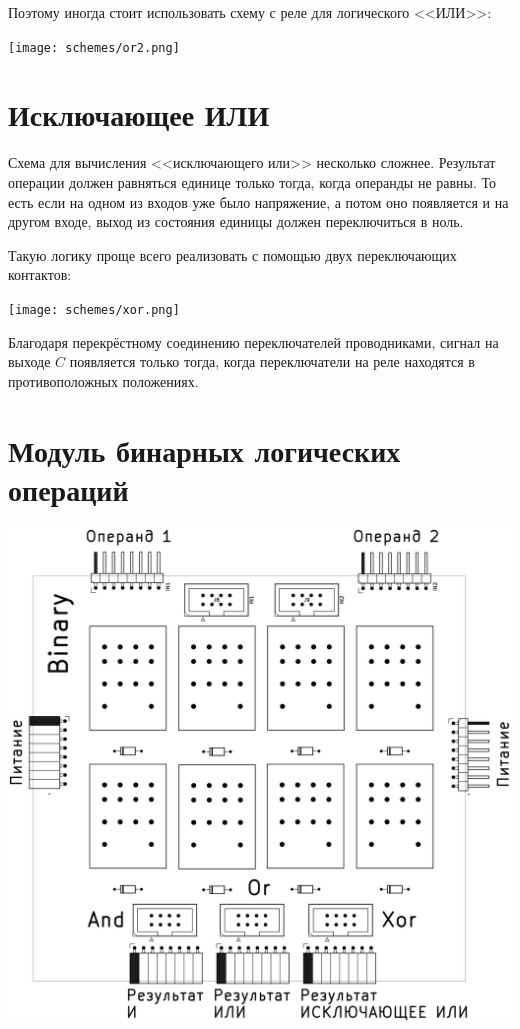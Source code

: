 Поэтому иногда стоит использовать схему с реле для логического <<ИЛИ>>:

\begin{center}
\texttt{[image: schemes/or2.png]}
\end{center}


\section{Исключающее ИЛИ}

Схема для вычисления <<исключающего или>> несколько сложнее.
Результат операции должен равняться единице только тогда,
когда операнды не равны. То есть если на одном из входов уже
было напряжение, а потом оно появляется и на другом входе,
выход из состояния единицы должен переключиться в ноль.

Такую логику проще всего реализовать с помощью двух переключающих контактов:

\begin{center}
\texttt{[image: schemes/xor.png]}
\end{center}

Благодаря перекрёстному соединению переключателей проводниками,
сигнал на выходе $C$ появляется только тогда, когда переключатели на реле
находятся в противоположных положениях.

\section{Модуль бинарных логических операций}

\begin{center}
\includegraphics{boards/logic_binary.png}
\end{center}

